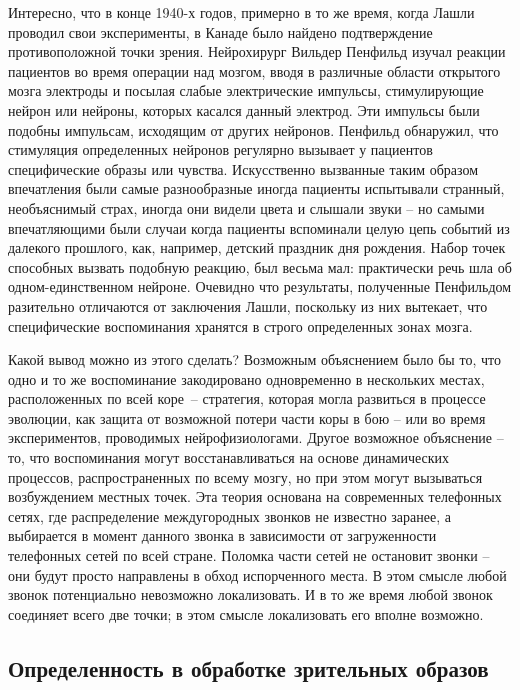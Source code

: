 \documentclass[../main.tex]{subfiles}
\begin{document}
Интересно, что в конце 1940-х годов, примерно в то же время, когда Лашли проводил свои эксперименты, в Канаде было найдено подтверждение противоположной точки зрения. Нейрохирург Вильдер Пенфильд изучал реакции пациентов во время операции над мозгом, вводя в различные области открытого мозга электроды и посылая слабые электрические импульсы, стимулирующие нейрон или нейроны, которых касался данный электрод. Эти импульсы были подобны импульсам, исходящим от других нейронов. Пенфильд обнаружил, что стимуляция определенных нейронов регулярно вызывает у пациентов специфические образы или чувства. Искусственно вызванные таким образом впечатления были самые разнообразные иногда пациенты испытывали странный, необъяснимый страх, иногда они видели цвета и слышали звуки \--- но самыми впечатляющими были случаи когда пациенты вспоминали целую цепь событий из далекого прошлого, как, например, детский праздник дня рождения. Набор точек способных вызвать подобную реакцию, был весьма мал: практически речь шла об одном-единственном нейроне. Очевидно что результаты, полученные Пенфильдом разительно отличаются от заключения Лашли, поскольку из них вытекает, что специфические воспоминания хранятся в строго определенных зонах мозга.

Какой вывод можно из этого сделать? Возможным объяснением было бы то, что одно и то же воспоминание закодировано одновременно в нескольких местах, расположенных по всей коре~\--- стратегия, которая могла развиться в процессе эволюции, как защита от возможной потери части коры в бою \--- или во время экспериментов, проводимых нейрофизиологами. Другое возможное объяснение \--- то, что воспоминания могут восстанавливаться на основе динамических процессов, распространенных по всему мозгу, но при этом могут вызываться возбуждением местных точек. Эта теория основана на современных телефонных сетях, где распределение междугородных звонков не известно заранее, а выбирается в момент данного звонка в зависимости от загруженности телефонных сетей по всей стране. Поломка части сетей не остановит звонки \--- они будут просто направлены в обход испорченного места. В этом смысле любой звонок потенциально невозможно локализовать. И в то же время любой звонок соединяет всего две точки; в этом смысле локализовать его вполне возможно.


\subsection{Определенность в обработке зрительных образов}
\end{document}
